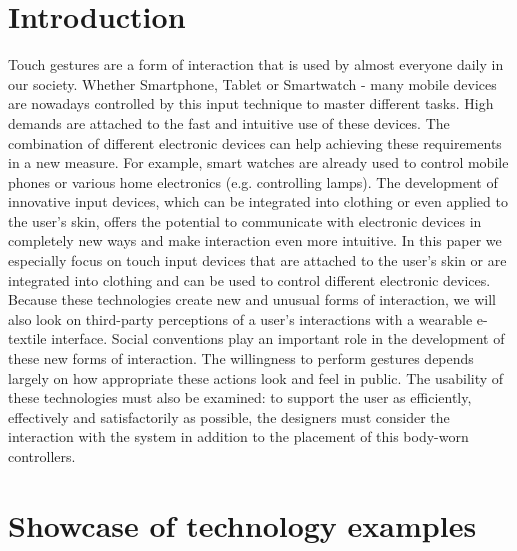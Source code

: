 \documentclass{sigchi}
\begin{document}
\section{Introduction}
%

Touch gestures are a form of interaction that is used by almost everyone daily in our society. Whether Smartphone, Tablet or Smartwatch - many mobile devices are nowadays controlled by this input technique to master different tasks. High demands are attached to the fast and intuitive use of these devices. The combination of different electronic devices can help achieving these requirements in a new measure. For example, smart watches are already used to control mobile phones or various home electronics (e.g. controlling lamps). The development of innovative input devices, which can be integrated into clothing or even applied to the user's skin, offers the potential to communicate with electronic devices in completely new ways and make interaction even more intuitive. In this paper we especially focus on touch input devices that are attached to the user's skin or are integrated into clothing and can be used to control different electronic devices.
Because these technologies create new and unusual forms of interaction, we will also look on third-party perceptions of a user’s interactions with a wearable e-textile interface. Social conventions play an important role in the development of these new forms of interaction. The willingness to perform gestures depends largely on how appropriate these actions look and feel in public. \cite{touch-wrist} The usability of these technologies must also be examined: to support the user as efficiently, effectively and satisfactorily as possible, the designers must consider the interaction with the system in addition to the placement of this body-worn controllers.

\section{Showcase of technology examples}
%
\end{document}
